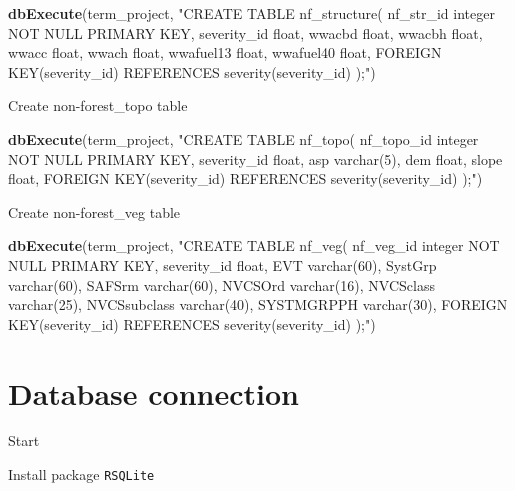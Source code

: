 \documentclass[]{book}
\newenvironment{Shaded}{\begin{snugshade}}{\end{snugshade}}
\newcommand{\KeywordTok}[1]{\textcolor[rgb]{0.13,0.29,0.53}{\textbf{#1}}}
\newcommand{\NormalTok}[1]{#1}
\newcommand{\StringTok}[1]{\textcolor[rgb]{0.31,0.60,0.02}{#1}}
\begin{document}
\begin{Shaded}
\begin{Highlighting}[]
\KeywordTok{dbExecute}\NormalTok{(term_project, }\StringTok{"CREATE TABLE nf_structure(}
\StringTok{nf_str_id integer NOT NULL PRIMARY KEY,}
\StringTok{severity_id float,}
\StringTok{wwacbd float,}
\StringTok{wwacbh float,}
\StringTok{wwacc float,}
\StringTok{wwach float,}
\StringTok{wwafuel13 float,}
\StringTok{wwafuel40 float,}
\StringTok{FOREIGN KEY(severity_id) REFERENCES severity(severity_id)}
\StringTok{);"}\NormalTok{)}
\end{Highlighting}
\end{Shaded}

Create non-forest\_topo table

\begin{Shaded}
\begin{Highlighting}[]
\KeywordTok{dbExecute}\NormalTok{(term_project, }\StringTok{"CREATE TABLE nf_topo(}
\StringTok{nf_topo_id integer NOT NULL PRIMARY KEY,}
\StringTok{severity_id float,}
\StringTok{asp varchar(5),}
\StringTok{dem float,}
\StringTok{slope float,}
\StringTok{FOREIGN KEY(severity_id) REFERENCES severity(severity_id)}
\StringTok{);"}\NormalTok{)}
\end{Highlighting}
\end{Shaded}

Create non-forest\_veg table

\begin{Shaded}
\begin{Highlighting}[]
\KeywordTok{dbExecute}\NormalTok{(term_project, }\StringTok{"CREATE TABLE nf_veg(}
\StringTok{nf_veg_id integer NOT NULL PRIMARY KEY,}
\StringTok{severity_id float,}
\StringTok{EVT varchar(60),}
\StringTok{SystGrp varchar(60),}
\StringTok{SAFSrm varchar(60),}
\StringTok{NVCSOrd varchar(16),}
\StringTok{NVCSclass varchar(25),}
\StringTok{NVCSsubclass varchar(40),}
\StringTok{SYSTMGRPPH varchar(30),}
\StringTok{FOREIGN KEY(severity_id) REFERENCES severity(severity_id)}
\StringTok{);"}\NormalTok{)}
\end{Highlighting}
\end{Shaded}

\hypertarget{SQL}{%
\chapter{Database connection}\label{SQL}}

Start

Install package \texttt{RSQLite}
\end{document}
